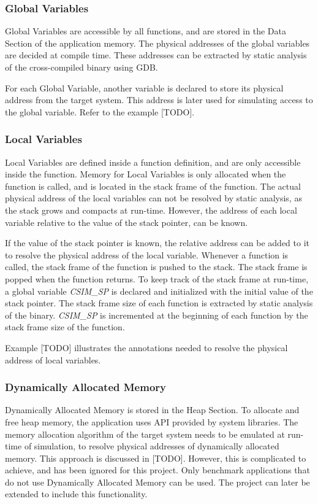 \subsubsection{Global Variables}
Global Variables are accessible by all functions, and are stored in the Data Section of the application memory. The physical addresses of the global variables are decided at compile time. These addresses can be extracted by static analysis of the cross-compiled binary using GDB.

For each Global Variable, another variable is declared to store its physical address from the target system. This address is later used for simulating access to the global variable. Refer to the example [TODO].

\subsubsection{Local Variables}
Local Variables are defined inside a function definition, and are only accessible inside the function. Memory for Local Variables is only allocated when the function is called, and is located in the stack frame of the function. The actual physical address of the local variables can not be resolved by static analysis, as the stack grows and compacts at run-time. However, the address of each local variable relative to the value of the stack pointer, can be known.

If the value of the stack pointer is known, the relative address can be added to it to resolve the physical address of the local variable. Whenever a function is called, the stack frame of the function is pushed to the stack. The stack frame is popped when the function returns. To keep track of the stack frame at run-time, a global variable \emph{CSIM\_SP} is declared and initialized with the initial value of the stack pointer. The stack frame size of each function is extracted by static analysis of the binary. \emph{CSIM\_SP} is incremented at the beginning of each function by the stack frame size of the function.

Example [TODO] illustrates the annotations needed to resolve the physical address of local variables.

\subsubsection{Dynamically Allocated Memory}
Dynamically Allocated Memory is stored in the Heap Section. To allocate and free heap memory, the application uses API provided by system libraries. The memory allocation algorithm of the target system needs to be emulated at run-time of simulation, to resolve physical addresses of dynamically allocated memory. This approach is discussed in [TODO]. However, this is complicated to achieve, and has been ignored for this project. Only benchmark applications that do not use Dynamically Allocated Memory can be used. The project can later be extended to include this functionality.

